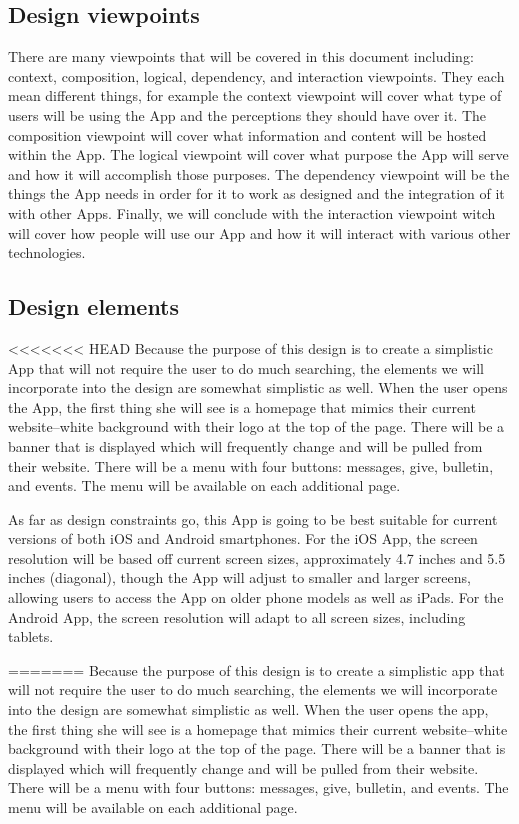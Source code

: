 \documentclass[letterpaper,10pt,draftclsnofoot,onecolumn,titlepage]{IEEEtran}
\begin{document}
		\subsection{Design viewpoints}
		There are many viewpoints that will be covered in this document including: context, composition, logical, dependency, and interaction viewpoints.
		They each mean different things, for example the context viewpoint will cover what type of users will be using the \gls{App} and the perceptions they should have over it.
		The composition viewpoint will cover what information and content will be hosted within the \gls{App}.
		The logical viewpoint will cover what purpose the \gls{App} will serve and how it will accomplish those purposes.
		The dependency viewpoint will be the things the \gls{App} needs in order for it to work as designed and the integration of it with other \glspl{App}.
		Finally, we will conclude with the interaction viewpoint witch will cover how people will use our \gls{App} and how it will interact with various other technologies.

		\subsection{Design elements}
<<<<<<< HEAD
			Because the purpose of this design is to create a simplistic \gls{App} that will not require the user to do much searching, the elements we will incorporate into the design are somewhat simplistic as well.
			When the user opens the \gls{App}, the first thing she will see is a homepage that mimics their current website--white background with their logo at the top of the page.
			There will be a banner that is displayed which will frequently change and will be pulled from their website.
			There will be a menu with four buttons: messages, give, bulletin, and events.
			The menu will be available on each additional page.

			As far as design constraints go, this \gls{App} is going to be best suitable for current versions of both \gls{iOS} and \gls{Android} smartphones.
			For the \gls{iOS} \gls{App}, the screen resolution will be based off current screen sizes, approximately 4.7 inches and 5.5 inches (diagonal), though the \gls{App} will adjust to smaller and larger screens, allowing users to access the \gls{App} on older phone models as well as iPads.
			For the \gls{Android} \gls{App}, the screen resolution will adapt to all screen sizes, including tablets.

=======
			Because the purpose of this design is to create a simplistic app that will not require the user to do much searching, the elements we will incorporate into the design are somewhat simplistic as well.
			When the user opens the app, the first thing she will see is a homepage that mimics their current website--white background with their logo at the top of the page.
			There will be a banner that is displayed which will frequently change and will be pulled from their website.
			There will be a menu with four buttons: messages, give, bulletin, and events.
			The menu will be available on each additional page.
\end{document}
